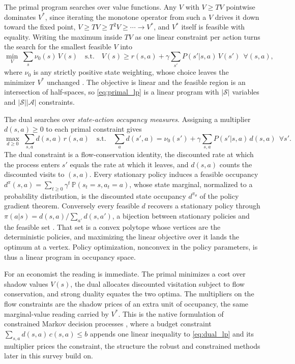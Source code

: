 The primal program searches over value functions. Any $V$ with $V \geq TV$ pointwise dominates $V^*$, since iterating the monotone operator from such a $V$ drives it down toward the fixed point, $V \geq TV \geq T^2 V \geq \cdots \to V^*$, and $V^*$ itself is feasible with equality. Writing the maximum inside $TV$ as one linear constraint per action turns the search for the smallest feasible $V$ into
\begin{equation}
\min_{V} \; \sum_s \nu_0(s)\, V(s) \quad \text{s.t.} \quad V(s) \geq r(s,a) + \gamma \sum_{s'} P(s'|s,a)\, V(s') \ \ \forall (s,a),
\label{eq:primal_lp}
\end{equation}
where $\nu_0$ is any strictly positive state weighting, whose choice leaves the minimizer $V^*$ unchanged \citep{manne1960,depenoux1963}. The objective is linear and the feasible region is an intersection of half-spaces, so \eqref{eq:primal_lp} is a linear program with $|\mathcal{S}|$ variables and $|\mathcal{S}||\mathcal{A}|$ constraints.

The dual searches over \emph{state-action occupancy measures}. Assigning a multiplier $d(s,a) \geq 0$ to each primal constraint gives
\begin{equation}
\max_{d \geq 0} \; \sum_{s,a} d(s,a)\, r(s,a) \quad \text{s.t.} \quad \sum_a d(s',a) = \nu_0(s') + \gamma \sum_{s,a} P(s'|s,a)\, d(s,a) \ \ \forall s'.
\label{eq:dual_lp}
\end{equation}
The dual constraint is a flow-conservation identity, the discounted rate at which the process enters $s'$ equals the rate at which it leaves, and $d(s,a)$ counts the discounted visits to $(s,a)$. Every stationary policy induces a feasible occupancy $d^\pi(s,a) = \sum_{t \geq 0} \gamma^t\, \mathbb{P}(s_t = s, a_t = a)$, whose state marginal, normalized to a probability distribution, is the discounted state occupancy $d^{\pi_\theta}$ of the policy gradient theorem. Conversely every feasible $d$ recovers a stationary policy through $\pi(a|s) = d(s,a) / \sum_{a'} d(s,a')$, a bijection between stationary policies and the feasible set \citep[Ch.~6.9]{puterman1994}. That set is a convex polytope whose vertices are the deterministic policies, and maximizing the linear objective over it lands the optimum at a vertex. Policy optimization, nonconvex in the policy parameters, is thus a linear program in occupancy space.

For an economist the reading is immediate. The primal minimizes a cost over shadow values $V(s)$, the dual allocates discounted visitation subject to flow conservation, and strong duality equates the two optima. The multipliers on the flow constraints are the shadow prices of an extra unit of occupancy, the same marginal-value reading carried by $V^*$. This is the native formulation of constrained Markov decision processes \citep{Altman1999}, where a budget constraint $\sum_{s,a} d(s,a)\, c(s,a) \leq b$ appends one linear inequality to \eqref{eq:dual_lp} and its multiplier prices the constraint, the structure the robust and constrained methods later in this survey build on.


